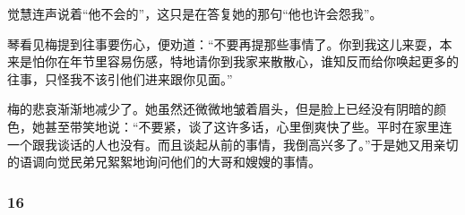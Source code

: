 \par 觉慧连声说着“他不会的”，这只是在答复她的那句“他也许会怨我”。
\par 琴看见梅提到往事要伤心，便劝道：“不要再提那些事情了。你到我这儿来耍，本来是怕你在年节里容易伤感，特地请你到我家来散散心，谁知反而给你唤起更多的往事，只怪我不该引他们进来跟你见面。”
\par 梅的悲哀渐渐地减少了。她虽然还微微地皱着眉头，但是脸上已经没有阴暗的颜色，她甚至带笑地说：“不要紧，谈了这许多话，心里倒爽快了些。平时在家里连一个跟我谈话的人也没有。而且谈起从前的事情，我倒高兴多了。”于是她又用亲切的语调向觉民弟兄絮絮地询问他们的大哥和嫂嫂的事情。



\subsubsection*{16}



